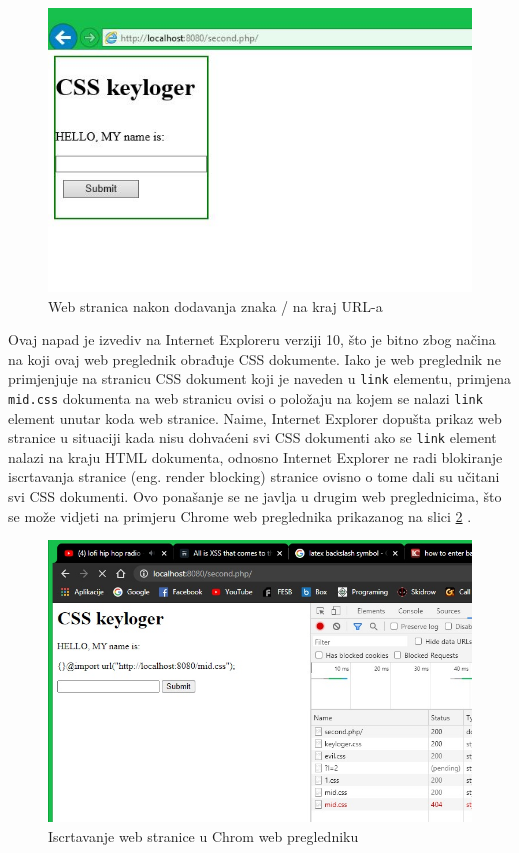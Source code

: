 \documentclass[12pt, oneside, onecolumn]{book}
\begin{document}
{\begin{figure}[H]
	\begin{center}
		\includegraphics[width=\textwidth]{css_slh.jpg}
		\caption{Web stranica nakon dodavanja znaka / na kraj URL-a} \label{fig:css_slh}
	\end{center}
\end{figure}

Ovaj napad je izvediv na Internet Exploreru verziji 10, što je bitno zbog načina na koji ovaj web preglednik obrađuje CSS dokumente. Iako je web preglednik ne primjenjuje na stranicu CSS dokument koji je naveden u \texttt{link} elementu, primjena \texttt{mid.css} dokumenta na web stranicu ovisi o položaju na kojem se nalazi \texttt{link} element unutar koda web stranice. Naime, Internet Explorer dopušta prikaz web stranice u situaciji kada nisu dohvaćeni svi CSS dokumenti ako se \texttt{link} element nalazi na kraju HTML dokumenta, odnosno Internet Explorer ne radi blokiranje iscrtavanja stranice (eng. render blocking) stranice ovisno o tome dali su učitani svi CSS dokumenti. Ovo ponašanje se ne javlja u drugim web preglednicima, što se može vidjeti na primjeru Chrome web preglednika prikazanog na slici \ref{fig:css_pend} \cite{cssnapad2}.

\begin{figure}[H]
	\begin{center}
		\includegraphics[width=\textwidth]{css_pend.jpg}
		\caption{Iscrtavanje web stranice u Chrom web pregledniku} \label{fig:css_pend}
	\end{center}
\end{figure}

}
\end{document}
